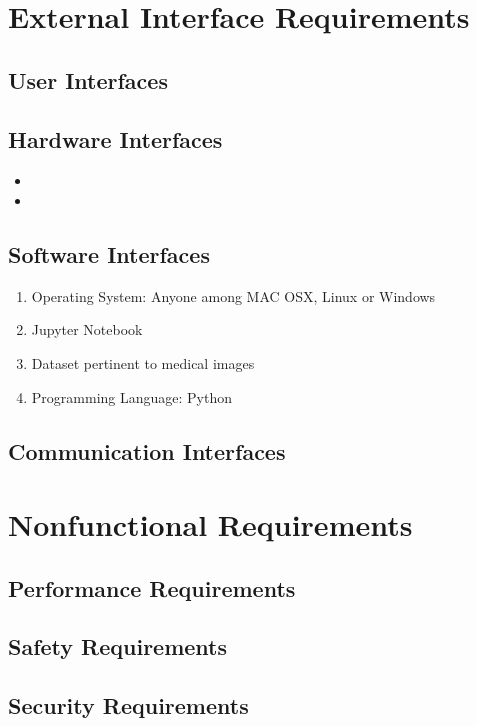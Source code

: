 \documentclass[oneside,a4paper,12pt]{book}
\begin{document}
\newpage 
\section{External Interface Requirements}


\subsection{User Interfaces}

\subsection{Hardware Interfaces}

\begin{itemize}
    \item 
    \item 
\end{itemize}


\subsection{Software Interfaces}

\begin{enumerate}
\item Operating System: Anyone among MAC OSX, Linux or Windows 
\item Jupyter Notebook
\item Dataset pertinent to medical images
\item Programming Language: Python
\end{enumerate}

\subsection{Communication Interfaces}
\newpage 
\section{Nonfunctional Requirements}
    \subsection{Performance Requirements}
    \subsection{Safety Requirements}
    \subsection{Security Requirements}
\end{document}

